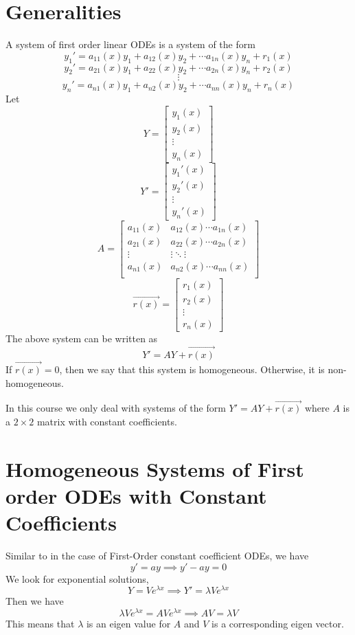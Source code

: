 \documentclass[openany]{report}
\begin{document}
\section{Generalities}
\begin{definition}
    A system of first order linear ODEs is a system of the form 
    \[y_1' = a_{11}(x)y_1 + a_{12}(x)y_2 + \cdots a_{1n}(x)y_n + r_1(x)\]
    \[y_2' = a_{21}(x)y_1 + a_{22}(x)y_2 + \cdots a_{2n}(x)y_n + r_2(x)\]
    \[\vdots\]
    \[y_n' = a_{n1}(x)y_1 + a_{n2}(x)y_2 + \cdots a_{nn}(x)y_n + r_n(x)\]
    Let 
    \[Y = \begin{bmatrix}
        y_1(x)\\
        y_2(x)\\
        \vdots\\
        y_n(x)
    \end{bmatrix}\]
    \[Y' = \begin{bmatrix}
        y_1'(x)\\
        y_2'(x)\\
        \vdots\\
        y_n'(x)
    \end{bmatrix}\]
    \[A = \begin{bmatrix}
        a_{11}(x) & a_{12}(x) \cdots a_{1n}(x)\\
        a_{21}(x) & a_{22}(x) \cdots a_{2n}(x)\\
        \vdots & \vdots \ddots \vdots\\
        a_{n1}(x) & a_{n2}(x) \cdots a_{nn}(x)\\
    \end{bmatrix}\]
    \[\overrightarrow{r(x)} = \begin{bmatrix}
        r_1(x)\\
        r_2(x)\\
        \vdots\\
        r_n(x)
    \end{bmatrix}\]
    The above system can be written as 
    \[Y' = AY + \overrightarrow{r(x)}\]
    If $\overrightarrow{r(x)} = 0$, then we say that this system is homogeneous. Otherwise, it is non-homogeneous.
\end{definition}
In this course we only deal with systems of the form $Y' = AY + \overrightarrow{r(x)}$ where $A$ is a $2\times 2$ matrix with constant coefficients. 
\section{Homogeneous Systems of First order ODEs with Constant Coefficients}
Similar to in the case of First-Order constant coefficient ODEs, we have 
\[y' = ay \implies y' - ay = 0\]
We look for exponential solutions,
\[Y = Ve^{\lambda x} \implies Y' = \lambda Ve^{\lambda x}\]
Then we have
\[\lambda V e^{\lambda x} = AV e^{\lambda x} \implies AV = \lambda V\]
This means that $\lambda$ is an eigen value for $A$ and $V$ is a corresponding eigen vector. 
\end{document}
